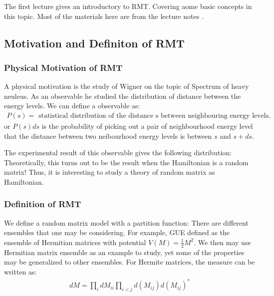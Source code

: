 The first lecture gives an introductory to RMT. Covering aome basic concepts in this topic. Most of the materials here are from the lecture notes \cite{eynardRandomMatrices2018}. 

\subsection{Motivation and Definiton of RMT}

\subsubsection{Physical Motivation of RMT}

A physical motivation is the study of Wigner on the topic of Spectrum of heavy neuleus. As an observable he studied the distribution of distance between the energy levels. We can define a observable as:
\begin{align}
  P(s) = \text{ statistical distribution of the distance s between neighbouring energy levels.}
\end{align}
or $ P(s)ds $ is the probability of picking out a pair of neighbourhood energy level that the distance between two neibourhood energy levels is between $ s $ and $ s + ds $.

The experimental result of this observable gives the following distribution:
Theoretically, this turns out to be the result when the Hamiltonian is a random matrix! Thus, it is interesting to study a theory of random matrix as Hamiltonian.


\subsubsection{Definition of RMT}

We define a random matrix model with a partition function:
There are different ensembles that one may be considering. For example, GUE defined as the ensemble of Hermitian matrices with potential $ V(M) = \frac{1}{2}M^2 $. We then may use Hermitian matrix ensemble as an example to study, yet some of the properties may be generalized to other ensembles. For Hermite matrices, the measure can be written as:
\begin{align}
  dM = \prod_i dM_{ii} \prod_{i<j} d(M_{ij}) d(M_{ij})^*
\end{align}

